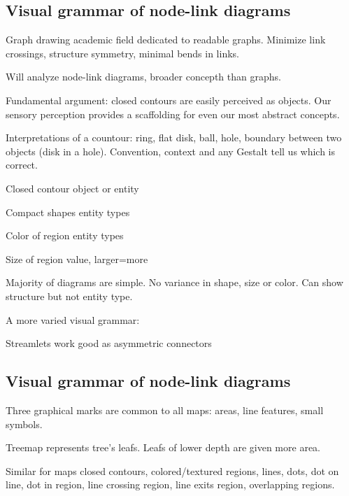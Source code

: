 \begin{mdframed}\begin{multicols}{2}
\subsection{Visual grammar of node-link diagrams}
\begin{compactdesc}
    \item[Graph drawing] academic field dedicated to readable graphs.
        Minimize link crossings, structure symmetry, minimal bends in links.
    \item[Will analyze] node-link diagrams, broader concepth than graphs.
    \item[Fundamental argument:] closed contours are easily perceived as
        objects. Our sensory perception provides a scaffolding for even our
        most abstract concepts.
    \item[Interpretations of a countour:] ring, flat disk, ball, hole,
        boundary between two objects (disk in a hole). Convention, context
        and any Gestalt tell us which is correct.
    \item[Closed contour] object or entity
    \item[Compact shapes] entity types
    \item[Color of region] entity types
    \item[Size of region] value, larger=more
    \item[Majority of diagrams] are simple. No variance in shape, size or color.
        Can show structure but not entity type.
    \item[A more varied] visual grammar:

    \item[Streamlets] work good as asymmetric connectors

\end{compactdesc}

\subsection{Visual grammar of node-link diagrams}
\begin{compactdesc}
    \item[Three graphical marks] are common to all maps: areas, line features,
        small symbols.

    \item[Treemap] represents tree's leafs. Leafs of lower depth are given
        more area.
    \item[Similar for maps] closed contours, colored/textured regions,
        lines, dots, dot on line, dot in region, line crossing region, line
        exits region, overlapping regions.
\end{compactdesc}


\end{multicols}
\end{mdframed}
